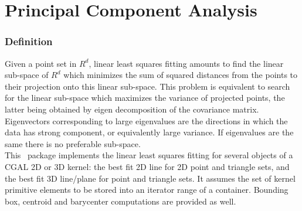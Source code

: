 
\chapter{Principal Component Analysis}
\label{ref_chapter_pca}


\subsection*{Definition}

Given a point set in $R^d$, linear least squares fitting amounts to
find the linear sub-space of $R^d$ which minimizes the sum of squared
distances from the points to their projection onto this linear
sub-space. This problem is equivalent to search for the linear
sub-space which maximizes the variance of projected points, the latter
being obtained by eigen decomposition of the covariance
matrix. Eigenvectors corresponding to large eigenvalues are the
directions in which the data has strong component, or equivalently
large variance. If eigenvalues are the same there is no preferable
sub-space.\\

This \cgal\ package implements the linear least squares fitting for
several objects of a CGAL 2D or 3D kernel: the best fit 2D line for 2D
point and triangle sets, and the best fit 3D line/plane for point and
triangle sets. It assumes the set of kernel primitive elements to be stored into an
iterator range of a container. Bounding box, centroid and barycenter
computations are provided as well. 




\\
\\
\\
\\
\clearpage

